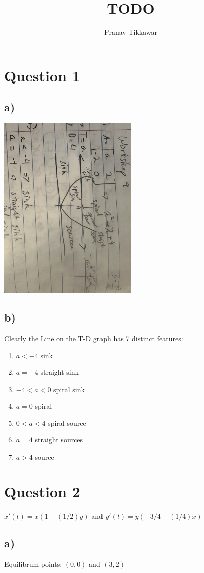 \documentclass{article}
\author{Pranav Tikkawar}
\title{TODO}
\begin{document}
\maketitle
\section*{Question 1}
\subsection*{a)}
\includegraphics[width=0.5\textwidth]{IMG_2809.jpg}
\subsection*{b)}
Clearly the Line on the T-D graph has 7 distinct features:
\begin{enumerate}
    \item $a<-4$ sink
    \item $a=-4$ straight sink
    \item $-4<a<0$ spiral sink
    \item $a=0$ spiral 
    \item $0<a<4$ spiral source
    \item $a=4$ straight sources
    \item $a>4$ source 
\end{enumerate}
\section*{Question 2}
$x'(t) = x(1-(1/2)y)$ and $y'(t) = y(-3/4+(1/4)x)$
\subsection*{a)}
Equilibrum points: $(0,0)$ and $(3,2)$
\end{document}
